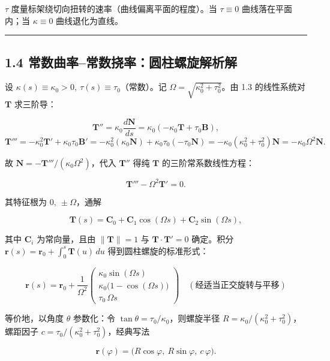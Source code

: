 \(\tau\) 度量标架绕切向扭转的速率（曲线偏离平面的程度）。当
\(\tau\equiv0\) 曲线落在平面内；当 \(\kappa\equiv0\) 曲线退化为直线。

\begin{center}\rule{0.5\linewidth}{0.5pt}\end{center}

\subsection{1.4
常数曲率--常数挠率：圆柱螺旋解析解}\label{ux5e38ux6570ux66f2ux7387ux5e38ux6570ux6320ux7387ux5706ux67f1ux87baux65cbux89e3ux6790ux89e3}

设 \(\kappa(s)\equiv\kappa_0>0,\ \tau(s)\equiv\tau_0\)（常数）。记
\(\Omega=\sqrt{\kappa_0^2+\tau_0^2}\)。由 1.3 的线性系统对
\(\mathbf{T}\) 求三阶导：

\[
\mathbf{T}''=\kappa_0\frac{d\mathbf{N}}{ds}=\kappa_0(-\kappa_0\mathbf{T}+\tau_0\mathbf{B}),
\] \[
\mathbf{T}'''=-\kappa_0^2\mathbf{T}'+\kappa_0\tau_0\mathbf{B}'
=-\kappa_0^2(\kappa_0\mathbf{N})+\kappa_0\tau_0(-\tau_0\mathbf{N})
=-\kappa_0(\kappa_0^2+\tau_0^2)\mathbf{N}=-\kappa_0\Omega^2\mathbf{N}.
\]

故 \(\mathbf{N}=-\mathbf{T}'''/(\kappa_0\Omega^2)\)，代入
\(\mathbf{T}''\) 得纯 \(\mathbf{T}\) 的三阶常系数线性方程：

\[
\mathbf{T}'''-\Omega^2\mathbf{T}'=0.
\]

其特征根为 \(0,\ \pm\Omega\)，通解

\[
\mathbf{T}(s)=\mathbf{C}_0+\mathbf{C}_1\cos(\Omega s)+\mathbf{C}_2\sin(\Omega s),
\]

其中 \(\mathbf{C}_i\) 为常向量，且由 \(\|\mathbf{T}\|=1\) 与
\(\mathbf{T}\cdot\mathbf{T}'=0\) 确定。积分
\(\mathbf{r}(s)=\mathbf{r}_0+\int_0^s\mathbf{T}(u)\,du\)
得到圆柱螺旋的标准形式：

\[
\boxed{
\mathbf{r}(s)=\mathbf{r}_0+
\frac{1}{\Omega^2}
\begin{pmatrix}
\kappa_0\sin(\Omega s)\\
\kappa_0\bigl(1-\cos(\Omega s)\bigr)\\
\tau_0\,\Omega s
\end{pmatrix}
\quad(\text{经适当正交旋转与平移})
}
\]

等价地，以角度 \(\theta\) 参数化：令
\(\tan\theta=\tau_0/\kappa_0\)，则螺旋半径
\(R=\kappa_0/(\kappa_0^2+\tau_0^2)\)，螺距因子
\(c=\tau_0/(\kappa_0^2+\tau_0^2)\)，经典写法

\[
\mathbf{r}(\varphi)=\bigl(R\cos\varphi,\ R\sin\varphi,\ c\,\varphi\bigr).
\]

